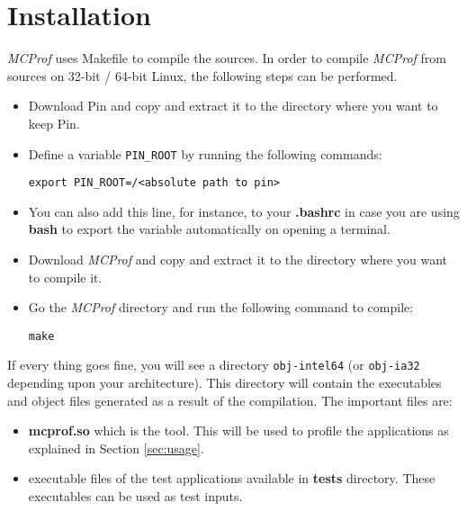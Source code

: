 \documentclass[11pt]{article}
\newcommand{\MCPROF}{\emph{MCProf}}
\begin{document}
\section{Installation}
\label{sec:installation}

\MCPROF{} uses Makefile to compile the sources. In order to compile \MCPROF{} from
sources on 32-bit / 64-bit Linux, the following steps can be performed.

\begin{itemize}

\item Download Pin and copy and extract it to the directory where you want to keep Pin.

\item Define a variable \verb|PIN_ROOT| by running the following commands:
{
\small
\begin{Verbatim}[frame=single]
export PIN_ROOT=/<absolute path to pin>
\end{Verbatim}
}

\item You can also add this line, for instance, to your \textbf{.bashrc} in case you are
using \textbf{bash} to export the variable automatically on opening a terminal.

\item Download \MCPROF{} and copy and extract it to the directory where you want to compile it.

\item Go the \MCPROF{} directory and run the following command to compile:
{
\small
\begin{Verbatim}[frame=single]
make
\end{Verbatim}
}

\end{itemize}

If every thing goes fine, you will see a directory \verb|obj-intel64| (or \verb|obj-ia32|
depending upon your architecture). This directory will contain the executables and
object files generated as a result of the compilation. The important files are:

\begin{itemize}
\item \textbf{mcprof.so} which is the tool. This will be used to profile the
applications as explained in Section \ref{sec:usage}.
\item executable files of the test applications available in \textbf{tests} directory.
These executables can be used as test inputs.
\end{itemize}
\end{document}
